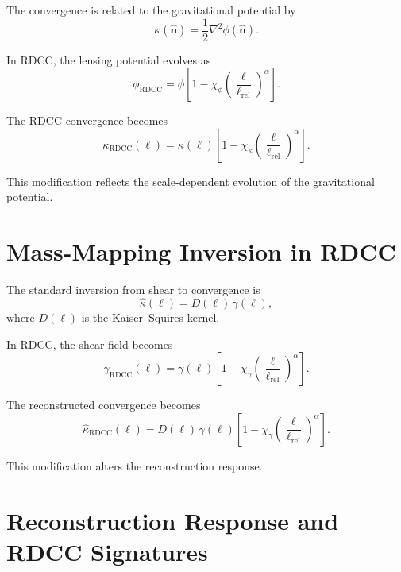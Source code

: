 \documentclass[11pt,a4paper]{article}
\begin{document}
The convergence is related to the gravitational potential by
\begin{equation}
    \kappa(\hat{\mathbf{n}})
    = \frac{1}{2}\nabla^{2}\phi(\hat{\mathbf{n}}).
\end{equation}

In RDCC, the lensing potential evolves as
\begin{equation}
    \phi_{\mathrm{RDCC}}
    = \phi
      \left[
        1 - \chi_{\phi}
        \left(\frac{\ell}{\ell_{\mathrm{rel}}}\right)^{\alpha}
      \right].
\end{equation}

The RDCC convergence becomes
\begin{equation}
    \kappa_{\mathrm{RDCC}}(\ell)
    = \kappa(\ell)
      \left[
        1 - \chi_{\kappa}
        \left(\frac{\ell}{\ell_{\mathrm{rel}}}\right)^{\alpha}
      \right].
\end{equation}

This modification reflects the scale-dependent evolution of the gravitational 
potential.
\section{Mass-Mapping Inversion in RDCC}

The standard inversion from shear to convergence is
\begin{equation}
    \hat{\kappa}(\ell)
    = D(\ell)\, \gamma(\ell),
\end{equation}
where $D(\ell)$ is the Kaiser–Squires kernel.

In RDCC, the shear field becomes
\begin{equation}
    \gamma_{\mathrm{RDCC}}(\ell)
    = \gamma(\ell)
      \left[
        1 - \chi_{\gamma}
        \left(\frac{\ell}{\ell_{\mathrm{rel}}}\right)^{\alpha}
      \right].
\end{equation}

The reconstructed convergence becomes
\begin{equation}
    \hat{\kappa}_{\mathrm{RDCC}}(\ell)
    = D(\ell)\,
      \gamma(\ell)
      \left[
        1 - \chi_{\gamma}
        \left(\frac{\ell}{\ell_{\mathrm{rel}}}\right)^{\alpha}
      \right].
\end{equation}

This modification alters the reconstruction response.
\section{Reconstruction Response and RDCC Signatures}
\end{document}
